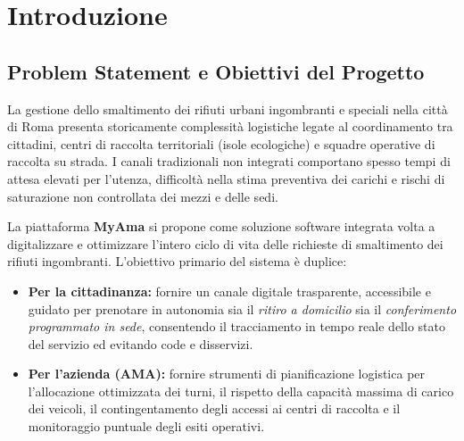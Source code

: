 \section{Introduzione}

\subsection{Problem Statement e Obiettivi del Progetto}
La gestione dello smaltimento dei rifiuti urbani ingombranti e speciali nella città di Roma presenta storicamente complessità logistiche legate al coordinamento tra cittadini, centri di raccolta territoriali (isole ecologiche) e squadre operative di raccolta su strada. I canali tradizionali non integrati comportano spesso tempi di attesa elevati per l'utenza, difficoltà nella stima preventiva dei carichi e rischi di saturazione non controllata dei mezzi e delle sedi.

La piattaforma \textbf{MyAma} si propone come soluzione software integrata volta a digitalizzare e ottimizzare l'intero ciclo di vita delle richieste di smaltimento dei rifiuti ingombranti. L'obiettivo primario del sistema è duplice:
\begin{itemize}[leftmargin=*]
    \item \textbf{Per la cittadinanza:} fornire un canale digitale trasparente, accessibile e guidato per prenotare in autonomia sia il \textit{ritiro a domicilio} sia il \textit{conferimento programmato in sede}, consentendo il tracciamento in tempo reale dello stato del servizio ed evitando code e disservizi.
    \item \textbf{Per l'azienda (AMA):} fornire strumenti di pianificazione logistica per l'allocazione ottimizzata dei turni, il rispetto della capacità massima di carico dei veicoli, il contingentamento degli accessi ai centri di raccolta e il monitoraggio puntuale degli esiti operativi.
\end{itemize}

